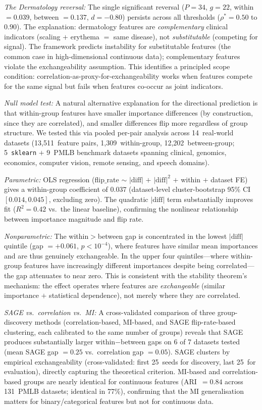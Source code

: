 \documentclass[11pt,a4paper]{article}
\begin{document}
\emph{The Dermatology reversal:} The single significant reversal ($P = 34$, $g = 22$, within $= 0.039$, between $= 0.137$, $d = -0.80$) persists across all thresholds ($\rho^* = 0.50$ to $0.90$).  The explanation: dermatology features are \emph{complementary} clinical indicators (scaling $+$ erythema $=$ same disease), not \emph{substitutable} (competing for signal).  The framework predicts instability for substitutable features (the common case in high-dimensional continuous data); complementary features violate the exchangeability assumption.  This identifies a principled scope condition: correlation-as-proxy-for-exchangeability works when features compete for the same signal but fails when features co-occur as joint indicators.

\emph{Null model test:} A natural alternative explanation for the directional prediction is that within-group features have smaller importance differences (by construction, since they are correlated), and smaller differences flip more regardless of group structure.  We tested this via pooled per-pair analysis across 14~real-world datasets (13{,}511~feature pairs, 1{,}309~within-group, 12{,}202~between-group; 5~\texttt{sklearn} $+$ 9~PMLB benchmark datasets spanning clinical, genomics, economics, computer vision, remote sensing, and speech domains).

\emph{Parametric:} OLS regression (flip$\_$rate $\sim$ $|\text{diff}|$ $+$ $|\text{diff}|^2$ $+$ within $+$ dataset FE) gives a within-group coefficient of $0.037$ (dataset-level cluster-bootstrap 95\% CI $[0.014, 0.045]$, excluding zero).  The quadratic $|\text{diff}|$ term substantially improves fit ($R^2 = 0.42$ vs.\ the linear baseline), confirming the nonlinear relationship between importance magnitude and flip rate.

\emph{Nonparametric:} The within$>$between gap is concentrated in the lowest $|\text{diff}|$ quintile (gap $= +0.061$, $p < 10^{-4}$), where features have similar mean importances and are thus genuinely exchangeable.  In the upper four quintiles---where within-group features have increasingly different importances despite being correlated---the gap attenuates to near zero.  This is consistent with the stability theorem's mechanism: the effect operates where features are \emph{exchangeable} (similar importance $+$ statistical dependence), not merely where they are correlated.

\emph{SAGE vs.\ correlation vs.\ MI:} A cross-validated comparison of three group-discovery methods (correlation-based, MI-based, and SAGE flip-rate-based clustering, each calibrated to the same number of groups) reveals that SAGE produces substantially larger within$-$between gaps on 6 of 7 datasets tested (mean SAGE gap $= 0.25$ vs.\ correlation gap $= 0.05$).  SAGE clusters by empirical exchangeability (cross-validated: first 25~seeds for discovery, last 25~for evaluation), directly capturing the theoretical criterion.  MI-based and correlation-based groups are nearly identical for continuous features (ARI~$= 0.84$ across 131~PMLB datasets; identical in 77\%), confirming that the MI generalisation matters for binary/categorical features but not for continuous data.
\end{document}
